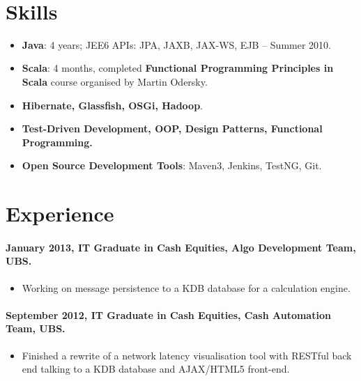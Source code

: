 \documentclass[11pt, a4paper]{article}
\newlength{\wideitemsep}
\let\olditem\item
\renewcommand{\item}{\setlength{\itemsep}{\wideitemsep}\olditem}
\begin{document}
\textsf{\\[0.1in]}


\section*{Skills}
\begin{itemize}
\item \textbf{Java}: 4 years; JEE6 APIs: JPA, JAXB, JAX-WS, EJB – Summer 2010.
\item \textbf{Scala}: 4 months, completed \textbf{Functional Programming Principles in Scala} course organised by Martin Odersky. 
\item \textbf{Hibernate, Glassfish, OSGi, Hadoop}.
\item \textbf{Test-Driven Development, OOP, Design Patterns, Functional Programming.}
\item \textbf{Open Source Development Tools}: Maven3, Jenkins, TestNG, Git.
\end{itemize}

\section*{Experience}

\paragraph{January 2013, IT Graduate in Cash Equities, Algo Development Team, UBS.}
\begin{itemize}
\item Working on message persistence to a KDB database for a calculation engine.  
\end{itemize}

\paragraph{September 2012, IT Graduate in Cash Equities, Cash Automation Team, UBS.}
\begin{itemize}
\item Finished a rewrite of a network latency visualisation tool with RESTful back end talking to a KDB database and AJAX/HTML5 front-end.  
\end{itemize}
\end{document}
